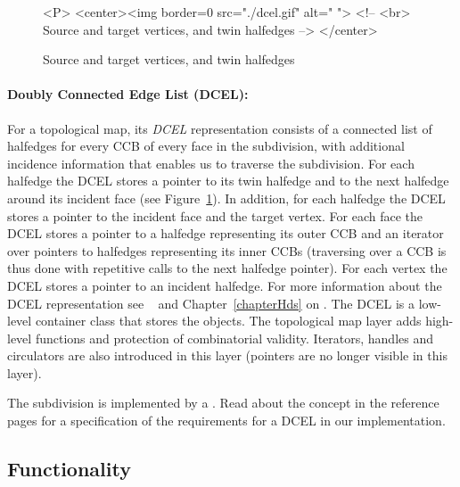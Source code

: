 \begin{figure}
\begin{ccTexOnly}
    \centerline{
       }
\end{ccTexOnly}
\caption{Source and target vertices, and twin halfedges \label{fig:DCEL}}

\begin{ccHtmlOnly}
<P>
<center><img border=0 src="./dcel.gif" alt=" ">
<!-- <br> Source and target vertices, and twin halfedges -->
</center>
\end{ccHtmlOnly}
\end{figure}

\paragraph{Doubly Connected Edge List (DCEL):}
For a topological map, its {\em DCEL} representation consists of a
connected list of halfedges for every CCB of every face in the
subdivision, with additional incidence information that enables us to
traverse the subdivision. %
For each halfedge the DCEL
stores a pointer to its twin halfedge and to the next
halfedge around its incident face (see Figure~\ref{fig:DCEL}). In
addition, for each halfedge the DCEL stores a pointer to the incident
face and the target vertex.
For each face the DCEL stores a pointer to a halfedge representing
its outer CCB and an iterator over pointers to halfedges representing
its inner CCBs (traversing over a CCB is thus done with repetitive
calls to the next halfedge pointer).
For each vertex the DCEL stores a pointer to an incident halfedge. 
For more information about the DCEL
representation see ~\cite{bkos-cgaa-97} and Chapter~\ref{chapterHds}
on .
The DCEL is a low-level container class that stores the objects.
The topological map layer adds high-level functions and protection of
combinatorial validity. Iterators, handles and circulators are also
introduced in this layer (pointers are no longer visible in this layer).

The subdivision is implemented by a .
Read about the concept
 in the reference pages 
for a specification of the requirements for a DCEL in our implementation.

\subsection*{Functionality}

